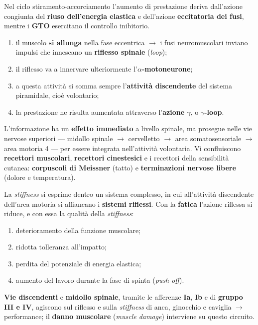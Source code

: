 Nel ciclo stiramento-accorciamento l'aumento di prestazione deriva dall'azione congiunta del
\textbf{riuso dell'energia elastica} e dell'azione \textbf{eccitatoria dei fusi}, mentre i
\textbf{GTO} esercitano il controllo inibitorio.

\begin{enumerate}
  \item il muscolo \textbf{si allunga} nella fase eccentrica $\rightarrow$ i fusi neuromuscolari
    inviano impulsi che innescano un \textbf{riflesso spinale} (\textit{loop});
  \item il riflesso va a innervare ulteriormente l'\textbf{$\alpha$-motoneurone};
  \item a questa attività si somma sempre l'\textbf{attività discendente} del sistema piramidale,
    cioè volontario;
  \item la prestazione ne risulta aumentata attraverso l'\textbf{azione $\gamma$}, o
    \textbf{$\gamma$-loop}.
\end{enumerate}

L'informazione ha un \textbf{effetto immediato} a livello spinale, ma prosegue nelle vie nervose
superiori --- midollo spinale $\rightarrow$ cervelletto $\rightarrow$ area somatosensoriale
$\rightarrow$ area motoria 4 --- per essere integrata nell'attività volontaria. Vi confluiscono
\textbf{recettori muscolari}, \textbf{recettori cinestesici} e i recettori della sensibilità
cutanea: \textbf{corpuscoli di Meissner} (tatto) e \textbf{terminazioni nervose libere} (dolore e
temperatura).

La \textit{stiffness} si esprime dentro un sistema complesso, in cui all'attività discendente
dell'area motoria si affiancano i \textbf{sistemi riflessi}. Con la \textbf{fatica} l'azione
riflessa si riduce, e con essa la qualità della \textit{stiffness}:
\begin{enumerate}
  \item deterioramento della funzione muscolare;
  \item ridotta tolleranza all'impatto;
  \item perdita del potenziale di energia elastica;
  \item aumento del lavoro durante la fase di spinta (\textit{push-off}).
\end{enumerate}

\textbf{Vie discendenti} e \textbf{midollo spinale}, tramite le afferenze \textbf{Ia},
\textbf{Ib} e di \textbf{gruppo III e IV}, agiscono sul riflesso e sulla \textit{stiffness} di
anca, ginocchio e caviglia $\rightarrow$ performance; il \textbf{danno muscolare}
(\textit{muscle damage}) interviene su questo circuito.
